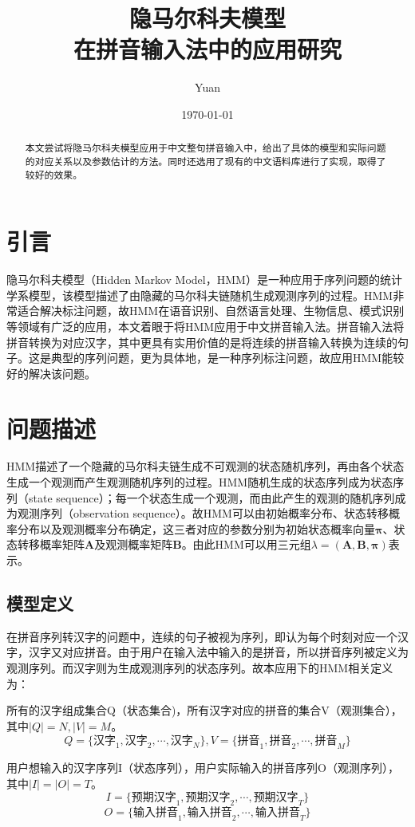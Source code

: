 \documentclass[12pt,a4paper,draft]{ctexart}
\title{隐马尔科夫模型 \\
	在拼音输入法中的应用研究}
\author{Yuan}
\date{\small\today}
\begin{document}
\maketitle
\begin{abstract}
本文尝试将隐马尔科夫模型应用于中文整句拼音输入中，给出了具体的模型和实际问题的对应关系以及参数估计的方法。同时还选用了现有的中文语料库进行了实现，取得了较好的效果。
\end{abstract}	
\section{引言}
隐马尔科夫模型（Hidden Markov Model，HMM）是一种应用于序列问题的统计学系模型，该模型描述了由隐藏的马尔科夫链随机生成观测序列的过程。HMM非常适合解决标注问题，故HMM在语音识别、自然语言处理、生物信息、模式识别等领域有广泛的应用，本文着眼于将HMM应用于中文拼音输入法。拼音输入法将拼音转换为对应汉字，其中更具有实用价值的是将连续的拼音输入转换为连续的句子。这是典型的序列问题，更为具体地，是一种序列标注问题，故应用HMM能较好的解决该问题。
\section{问题描述}
HMM描述了一个隐藏的马尔科夫链生成不可观测的状态随机序列，再由各个状态生成一个观测而产生观测随机序列的过程。HMM随机生成的状态序列成为状态序列（state sequence）；每一个状态生成一个观测，而由此产生的观测的随机序列成为观测序列（observation sequence）。故HMM可以由初始概率分布、状态转移概率分布以及观测概率分布确定，这三者对应的参数分别为初始状态概率向量$ \bm{\pi} $、状态转移概率矩阵$\bm{A}$及观测概率矩阵$\bm{B}$。由此HMM可以用三元组$ \lambda=(\bm{A},\bm{B},\bm{\pi}) $表示\cite{李航统计学习}。
\subsection{模型定义}
在拼音序列转汉字的问题中，连续的句子被视为序列，即认为每个时刻对应一个汉字，汉字又对应拼音。由于用户在输入法中输入的是拼音，所以拼音序列被定义为观测序列。而汉字则为生成观测序列的状态序列。故本应用下的HMM相关定义为：


所有的汉字组成集合Q（状态集合)，所有汉字对应的拼音的集合V（观测集合），其中$ |Q|=N, |V|=M $。
\[ Q=\{ \mbox{汉字}_1,\mbox{汉字}_2,\cdots,\mbox{汉字}_N \},V=\{ \mbox{拼音}_1,\mbox{拼音}_2,\cdots,\mbox{拼音}_M \}  \]

用户想输入的汉字序列I（状态序列），用户实际输入的拼音序列O（观测序列），其中$ |I|=|O|=T $。
\[ I=\{ \mbox{预期汉字}_1,\mbox{预期汉字}_2,\cdots,\mbox{预期汉字}_T \}	\]
\[O=\{ \mbox{输入拼音}_1,\mbox{输入拼音}_2,\cdots,\mbox{输入拼音}_T \}  \]
\end{document}
